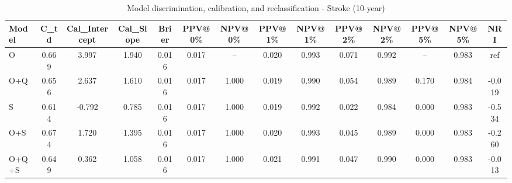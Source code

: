 \begin{table}[htbp]
\centering
\small
\caption{Model discrimination, calibration, and reclassification - Stroke (10-year)}
\label{tab:perf_stroke_10y}
\begin{tabular}{lccccccccccccc}
\toprule
Model & C\_td & Cal\_Intercept & Cal\_Slope & Brier & PPV@0\% & NPV@0\% & PPV@1\% & NPV@1\% & PPV@2\% & NPV@2\% & PPV@5\% & NPV@5\% & NRI \\
\midrule
O & 0.669 & 3.997 & 1.940 & 0.016 & 0.017 & -- & 0.020 & 0.993 & 0.071 & 0.992 & -- & 0.983 & ref \\
O+Q & 0.656 & 2.637 & 1.610 & 0.016 & 0.017 & 1.000 & 0.019 & 0.990 & 0.054 & 0.989 & 0.170 & 0.984 & -0.019 \\
S & 0.614 & -0.792 & 0.785 & 0.016 & 0.017 & 1.000 & 0.019 & 0.992 & 0.022 & 0.984 & 0.000 & 0.983 & -0.534 \\
O+S & 0.674 & 1.720 & 1.395 & 0.016 & 0.017 & 1.000 & 0.020 & 0.993 & 0.045 & 0.989 & 0.000 & 0.983 & -0.260 \\
O+Q+S & 0.649 & 0.362 & 1.058 & 0.016 & 0.017 & 1.000 & 0.021 & 0.991 & 0.047 & 0.990 & 0.000 & 0.983 & -0.013 \\
\bottomrule
\end{tabular}
\end{table}